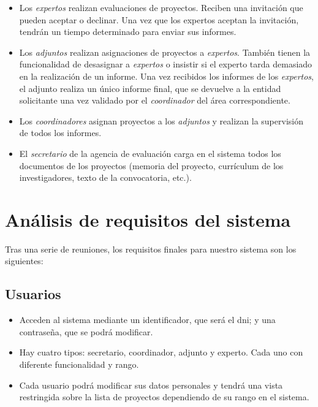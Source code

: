\documentclass[11pt,a4paper,spanish,twoside]{book}
\begin{document}
\begin{itemize}
\item Los \emph{expertos} realizan evaluaciones de proyectos. Reciben una 
  invitación que pueden aceptar o declinar. Una vez que los expertos aceptan
  la invitación, tendrán un tiempo determinado para enviar sus informes. 
\item Los \emph{adjuntos} realizan asignaciones de proyectos a
  \emph{expertos}. También tienen la funcionalidad de desasignar a
  \emph{expertos} o insistir si el experto tarda demasiado en la realización
  de un informe. Una vez recibidos los informes de los \emph{expertos}, el
  adjunto realiza un único informe final, que se devuelve a la entidad
  solicitante una vez validado por el \emph{coordinador} del área
  correspondiente.     
\item Los \emph{coordinadores} asignan proyectos a los \emph{adjuntos} y
  realizan la supervisión de todos los informes. 
\item El \emph{secretario} de la agencia de evaluación carga en el sistema todos
  los documentos de los proyectos (memoria del proyecto, currículum de los
  investigadores, texto de la convocatoria, etc.). 
\end{itemize}

\section{Análisis de requisitos del sistema}
Tras una serie de reuniones, los requisitos finales para nuestro sistema son
los siguientes: 

\subsection{Usuarios}
\begin{itemize}
\item Acceden al sistema mediante un identificador, que será el dni; y una 
contraseña, que se podrá modificar.
\item Hay cuatro tipos: secretario, coordinador, adjunto y experto. Cada uno
  con diferente funcionalidad y rango. 
\item Cada usuario podrá modificar sus datos personales y tendrá una vista
  restringida sobre la lista de proyectos dependiendo de su rango en el 
  sistema.
\end{itemize}
\end{document}
